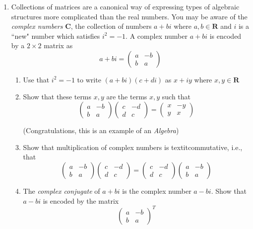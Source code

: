 \documentclass[12pt]{article}
\numberwithin{equation}{subsection}
\numberwithin{figure}{subsection}
\theoremstyle{note}
\begin{document}
\begin{enumerate}[label=\arabic*.]
	\item Collections of matrices are a canonical way of expressing types of algebraic structures more complicated than the real numbers. You may be aware of the \textit{complex numbers} $\mathbf{C}$, the collection of numbers $a+bi$ where $a,b\in \mathbf{R}$ and $i$ is a ``new" number which satisfies $i^2=-1$. A complex number $a+bi$ is encoded by a $2\times 2$ matrix as \[ a+bi=\begin{pmatrix} a & -b \\ b & a \end{pmatrix}\] 
	\begin{enumerate} 
	\item Use that $i^2=-1$ to write $(a+bi)(c+di)$ as $x+iy$ where $x,y\in \mathbf{R}$
	\item Show that these terms $x,y$ are the terms $x,y$ such that \[ \begin{pmatrix} a & -b \\ b & a \end{pmatrix}\begin{pmatrix} c & -d \\ d & c \end{pmatrix} = \begin{pmatrix} x & -y \\ y & x \end{pmatrix}\]
	
	(Congratulations, this is an example of an \textit{Algebra})
	
	\item Show that multiplication of complex numbers is textit{commutative}, i.e., that \[\begin{pmatrix} a & -b \\ b & a \end{pmatrix}\begin{pmatrix} c & -d \\ d & c \end{pmatrix}=\begin{pmatrix} c & -d \\ d & c \end{pmatrix}\begin{pmatrix} a & -b \\ b & a \end{pmatrix}\]
	
	\item The \textit{complex conjugate} of $a+bi$ is the complex number $a-bi$. Show that $a-bi$ is encoded by the matrix \[ \begin{pmatrix} a & -b \\ b & a \end{pmatrix}^T\]
	\end{enumerate}
	

\end{enumerate}
\end{document}
